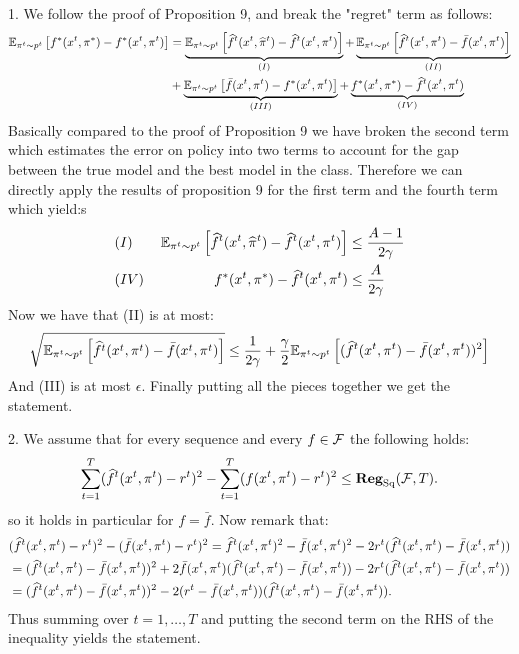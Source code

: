  \begin{solution}[]
    1. We follow the proof of Proposition 9, and break the "regret" term as follows:
    \begin{align*} \EEs{f^*(x^t,\pi^*)-f^*(x^t,\pi^t)}{\pi^t\sim p^t} &= 
        \underbrace{\EEs{\wh f^t(x^t,\wh \pi^t)-\wh f^t(x^t,\pi^t)}{\pi^t \sim p^t}}_{(I)}
    + \underbrace{\EEs{\wh f^t(x^t,\pi^t)-\bar f(x^t,\pi^t)}{\pi^t \sim p^t}}_{(II)}
   \\
    &+ \underbrace{\EEs{\bar f(x^t,\pi^t)- f^*(x^t,\pi^t)}{\pi^t \sim p^t}}_{(III)} +
     \underbrace{f^*(x^t,\pi^*) - \wh f^t(x^t,\pi^t)}_{(IV)}
    \end{align*}
    Basically compared to the proof of Proposition 9 we have broken the second term which estimates the error on policy into two terms to account for the gap between the true model and the best model in the class. 
    Therefore we can directly apply the results of proposition 9 for the first term and the fourth term which yield:s
    \begin{align*}
        (I) \qquad \EEs{\wh f^t(x^t,\wh \pi^t)-\wh f^t(x^t,\pi^t)}{\pi^t \sim p^t} &\leq \frac{A-1}{2\gamma}\\
        (IV)\qquad  \quad \qquad f^*(x^t,\pi^*) - \wh f^t(x^t,\pi^t) &\leq \frac{A}{2\gamma}
    \end{align*}
    Now we have that (II) is at most:
    \begin{align*}
        \sqrt{\EEs{\wh f^t(x^t,\pi^t)-\bar f(x^t,\pi^t)}{\pi^t \sim p^t}} \leq \frac{1}{2\gamma}+\frac{\gamma}{2}\EEs{(\wh f^t(x^t,\pi^t)-\bar f(x^t,\pi^t))^2}{\pi^t\sim p^t}
    \end{align*}
    And (III) is at most $\epsilon$. Finally putting all the pieces together we get the statement.

2. We assume that for every sequence and every $f \in \F$ the following holds:
\[ \sum_{t=1}^T(\wh f^t(x^t,\pi^t)-r^t)^2 -\sum_{t=1}^T(f(x^t,\pi^t)-r^t)^2\leq \Reg_{\text{Sq}}(\F,T).\]
so it holds in particular for $f = \bar f$.
Now remark that:
\begin{align*}
 &(\wh f^t(x^t,\pi^t) - r^t)^2 - (\bar f(x^t,\pi^t)-r^t)^2 = \wh f^t(x^t,\pi^t)^2 - \bar f(x^t,\pi^t)^2 -2r^t(\wh f^t(x^t,\pi^t)-\bar f(x^t,\pi^t)) \\
 &= (\wh f^t(x^t,\pi^t) - \bar f(x^t,\pi^t))^2 + 2\bar f(x^t,\pi^t)(\wh f^t(x^t,\pi^t)-\bar f(x^t,\pi^t))-2r^t(\wh f^t(x^t,\pi^t)-\bar f(x^t,\pi^t)) \\
&=(\wh f^t(x^t,\pi^t) - \bar f(x^t,\pi^t))^2  -2(r^t - \bar f(x^t,\pi^t))(\wh f^t(x^t,\pi^t)-\bar f(x^t,\pi^t)).
\end{align*}
Thus summing over $t=1,\ldots,T$ and putting the second term on the RHS of the inequality yields the statement.
\end{solution}
